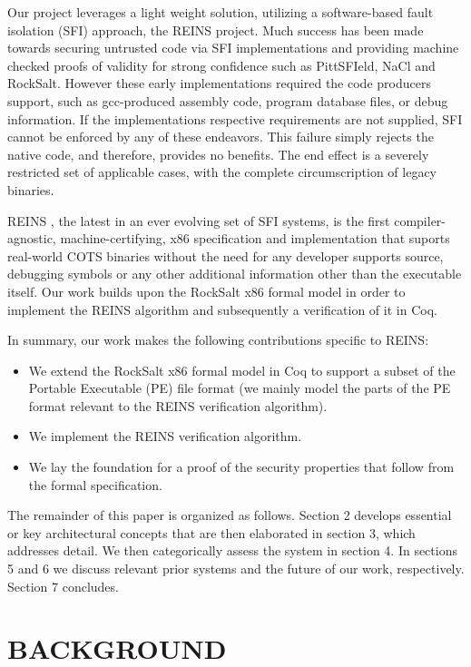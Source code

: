 \documentclass[conference]{IEEEtran}
\begin{document}
Our project leverages a light weight solution, utilizing a software-based fault isolation (SFI) approach, the REINS project.
Much success has been made towards securing untrusted code via SFI implementations and providing machine checked proofs of validity for strong confidence such as PittSFIeld\cite{McCamantM06}, NaCl\cite{Yee09nativeclient:} and RockSalt\cite{MorrisettTTTG12}.
However these early implementations required the code producers support, such as gcc-produced assembly code, program database files, or debug information.
If the implementations respective requirements are not supplied, SFI cannot be enforced by any of these endeavors.
This failure simply rejects the native code, and therefore, provides no benefits. 
The end effect is a severely restricted set of applicable cases, with the complete circumscription of legacy binaries.

REINS \cite{wartell12acsac}, the latest in an ever evolving set of SFI systems, is the first compiler-agnostic, machine-certifying, x86 specification and implementation that suports real-world COTS binaries without the need for any developer supports source, debugging symbols or any other additional information other than the executable itself.  
Our work builds upon the RockSalt x86 formal model in order to implement the REINS algorithm and subsequently a verification of it in Coq.  

In summary, our work makes the following contributions specific to REINS:
\begin{itemize}
\item We extend the RockSalt x86 formal model in Coq to support a subset of the Portable Executable (PE) file format (we mainly model the parts of the PE format relevant to the REINS verification algorithm).
\item We implement the REINS verification algorithm.
\item We lay the foundation for a proof of the security properties that follow from the formal specification.
\end{itemize}

The remainder of this paper is organized as follows.  
Section 2 develops essential or key architectural concepts that are then elaborated in section 3, which addresses detail.
We then categorically assess the system in section 4.  
In sections 5 and 6 we discuss relevant prior systems and the future of our work, respectively.
Section 7 concludes. 

\section{BACKGROUND}
\end{document}
